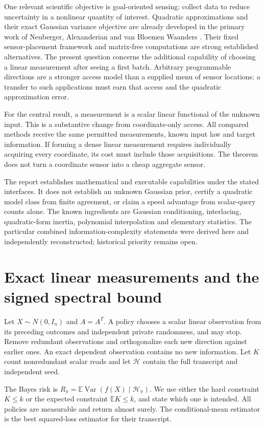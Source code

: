 \documentclass[11pt,a4paper]{article}
\newcommand{\E}{\mathbb E}\newcommand{\Var}{\operatorname{Var}}
\begin{document}
One relevant scientific objective is goal-oriented sensing: collect data to reduce uncertainty in a nonlinear quantity of interest. Quadratic approximations and their exact Gaussian variance objective are already developed in the primary work of Neuberger, Alexanderian and van Bloemen Waanders \cite{goal}. Their fixed sensor-placement framework and matrix-free computations are strong established alternatives. The present question concerns the additional capability of choosing a linear measurement after seeing a first batch. Arbitrary programmable directions are a stronger access model than a supplied menu of sensor locations; a transfer to such applications must earn that access and the quadratic approximation error.

For the central result, a measurement is a scalar linear functional of the unknown input. This is a substantive change from coordinate-only access. All compared methods receive the same permitted measurements, known input law and target information. If forming a dense linear measurement requires individually acquiring every coordinate, its cost must include those acquisitions. The theorem does not turn a coordinate sensor into a cheap aggregate sensor.

The report establishes mathematical and executable capabilities under the stated interfaces. It does not establish an unknown Gaussian prior, certify a quadratic model class from finite agreement, or claim a speed advantage from scalar-query counts alone. The known ingredients are Gaussian conditioning, interlacing, quadratic-form inertia, polynomial interpolation and elementary statistics. The particular combined information-complexity statements were derived here and independently reconstructed; historical priority remains open.

\section{Exact linear measurements and the signed spectral bound}

Let $X\sim N(0,I_n)$ and $A=A^T$. A policy chooses a scalar linear observation from its preceding outcomes and independent private randomness, and may stop. Remove redundant observations and orthogonalize each new direction against earlier ones. An exact dependent observation contains no new information. Let $K$ count nonredundant scalar reads and let $\mathcal H$ contain the full transcript and independent seed.

The Bayes risk is $R_\pi=\E\Var(f(X)\mid\mathcal H_\pi)$. We use either the hard constraint $K\le k$ or the expected constraint $\E K\le k$, and state which one is intended. All policies are measurable and return almost surely. The conditional-mean estimator is the best squared-loss estimator for their transcript.
\end{document}
